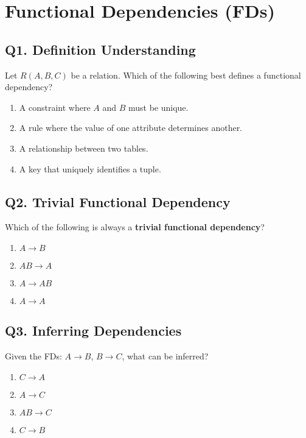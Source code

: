 \section{Functional Dependencies (FDs)}

\subsection*{Q1. Definition Understanding}
Let $R(A, B, C)$ be a relation. Which of the following best defines a functional dependency?

\begin{enumerate}[label=(\alph*)]
    \item A constraint where $A$ and $B$ must be unique.
    \item A rule where the value of one attribute determines another.
    \item A relationship between two tables.
    \item A key that uniquely identifies a tuple.
\end{enumerate}

\vspace{1em}

\subsection*{Q2. Trivial Functional Dependency}
Which of the following is always a \textbf{trivial functional dependency}?

\begin{enumerate}[label=(\alph*)]
    \item $A \rightarrow B$
    \item $AB \rightarrow A$
    \item $A \rightarrow AB$
    \item $A \rightarrow A$
\end{enumerate}

\vspace{1em}

\subsection*{Q3. Inferring Dependencies}
Given the FDs: $A \rightarrow B$, $B \rightarrow C$, what can be inferred?

\begin{enumerate}[label=(\alph*)]
    \item $C \rightarrow A$
    \item $A \rightarrow C$
    \item $AB \rightarrow C$
    \item $C \rightarrow B$
\end{enumerate}

